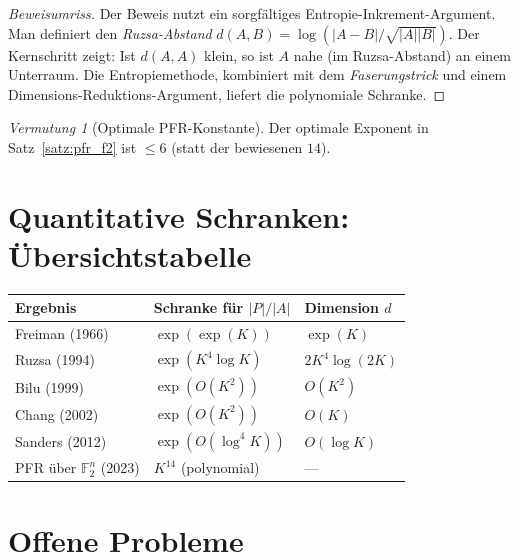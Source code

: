 \documentclass[12pt,a4paper]{amsart}
\theoremstyle{definition}
\theoremstyle{remark}
\newtheorem{vermutung}[theorem]{Vermutung}
\newcommand{\F}{\mathbb{F}}
\begin{document}
\begin{proof}[Beweisumriss]
Der Beweis nutzt ein sorgfältiges Entropie-Inkrement-Argument. Man definiert den
\emph{Ruzsa-Abstand} $d(A, B) = \log(|A-B| / \sqrt{|A||B|})$. Der Kernschritt
zeigt: Ist $d(A, A)$ klein, so ist $A$ nahe (im Ruzsa-Abstand) an einem Unterraum.
Die Entropiemethode, kombiniert mit dem \emph{Faserungstrick} und einem
Dimensions-Reduktions-Argument, liefert die polynomiale Schranke.
\end{proof}

\begin{vermutung}[Optimale PFR-Konstante]\label{verm:pfr_optimal}
Der optimale Exponent in Satz~\ref{satz:pfr_f2} ist $\leq 6$ (statt der bewiesenen
$14$).
\end{vermutung}

\section{Quantitative Schranken: Übersichtstabelle}\label{sec:tabelle}

\begin{center}
\begin{tabular}{lll}
\toprule
\textbf{Ergebnis} & \textbf{Schranke für $|P|/|A|$} & \textbf{Dimension $d$} \\
\midrule
Freiman (1966)   & $\exp(\exp(K))$        & $\exp(K)$ \\
Ruzsa (1994)     & $\exp(K^4 \log K)$     & $2K^4 \log(2K)$ \\
Bilu (1999)      & $\exp(O(K^2))$         & $O(K^2)$ \\
Chang (2002)     & $\exp(O(K^2))$         & $O(K)$ \\
Sanders (2012)   & $\exp(O(\log^4 K))$    & $O(\log K)$ \\
PFR über $\F_2^n$ (2023) & $K^{14}$ (polynomial) & --- \\
\bottomrule
\end{tabular}
\end{center}

\section{Offene Probleme}\label{sec:offen}
\end{document}
